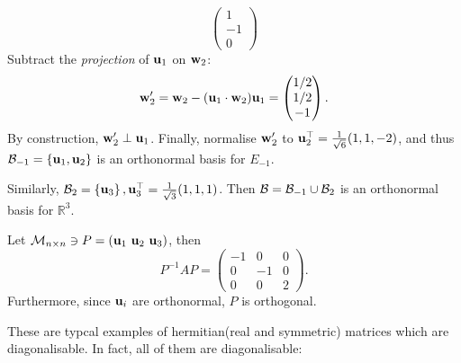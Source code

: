 \documentclass[10pt]{article}
\begin{document}
\begin{example}
\begin{enumerate}[(i)]
\[\begin{pmatrix}
                    1\\-1\\0
                \end{pmatrix}
            \]
            Subtract the \textit{projection} of ${\bf u}_1$ on ${\bf w}_2$:
            \[
                {\bf w}_2'={\bf w}_2-({\bf u}_1 \cdot {\bf w}_2){\bf u}_1=\begin{pmatrix}
                    1/2\\1/2\\-1
                \end{pmatrix}.
            \]
            By construction, $ {\bf w}_2' \perp {\bf u}_1 $. Finally, normalise $ {\bf w}_2' $ to $ {\bf u}_2^{\top}=\frac{1}{\sqrt{6}}(1,1,-2) $, and thus $ {\mathcal{B}}_{-1}=\left\{ {\bf u}_1,{\bf u}_2 \right\} $ is an orthonormal basis for $ E_{-1} $.

            Similarly, $ {\mathcal{B}}_2=\left\{ {\bf u}_3 \right\} , {\bf u}_3^{\top}=\frac{1}{\sqrt{3}}(1,1,1)$. Then $ {\mathcal{B}}={\mathcal{B}}_{-1}\cup {\mathcal{B}}_2 $ is an orthonormal basis for $ \mathbb{R}^{3} $.

            Let $ \mcM_{n\times n}\ni P=(\bfu_1\ \bfu_2\ \bfu_3) $, then 
            \[
                P^{-1}AP=\begin{pmatrix}
                    -1&0&0\\
                    0&-1&0\\
                    0&0&2
                \end{pmatrix}.
            \]
            Furthermore, since $ {\bf u}_i $ are orthonormal, $ P $ is orthogonal.
        \end{enumerate}
    \end{example}
    These are typcal examples of hermitian(real and symmetric) matrices which are diagonalisable. In fact, all of them are diagonalisable:
\end{document}
